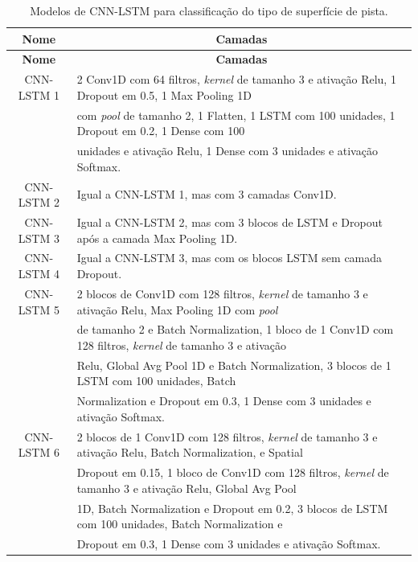 \begin{center}
\scriptsize
\begin{longtable}{cl}
\caption{Modelos de CNN-LSTM para classificação do tipo de superfície de pista.} 
\label{table:cnn_lstm_superficie_pista_1} \\
\toprule \textbf{Nome} & \multicolumn{1}{c}{\textbf{Camadas}} \\ \midrule
\endfirsthead
\toprule \textbf{Nome} & \multicolumn{1}{c}{\textbf{Camadas}} \\ \midrule
\endhead \endfoot \endlastfoot
CNN-LSTM 1 &  2 Conv1D com 64 filtros, \textit{kernel} de tamanho 3 e ativação Relu, 1 Dropout em 0.5, 1 Max Pooling 1D \\ & com \textit{pool} de tamanho 2, 1 Flatten, 1 LSTM com 100 unidades, 1 Dropout em 0.2, 1 Dense com 100 \\ & unidades e ativação Relu, 1 Dense com 3 unidades e ativação Softmax. \\ \midrule
CNN-LSTM 2 & Igual a CNN-LSTM 1, mas com 3 camadas Conv1D. \\ \midrule
CNN-LSTM 3 & Igual a CNN-LSTM 2, mas com 3 blocos de LSTM e Dropout após a camada Max Pooling 1D. \\ \midrule
CNN-LSTM 4 & Igual a CNN-LSTM 3, mas com os blocos LSTM sem camada Dropout. \\ \midrule
CNN-LSTM 5 &  2 blocos de Conv1D com 128 filtros, \textit{kernel} de tamanho 3 e ativação Relu, Max Pooling 1D com \textit{pool} \\ & de tamanho 2 e Batch Normalization, 1 bloco de 1 Conv1D com 128 filtros, \textit{kernel} de tamanho 3 e ativação \\ & Relu,  Global Avg Pool 1D e Batch Normalization, 3 blocos de 1 LSTM com 100 unidades, Batch \\ & Normalization e Dropout em 0.3, 1 Dense com 3 unidades e ativação Softmax. \\ \midrule
CNN-LSTM 6 & 2 blocos de 1 Conv1D com 128 filtros, \textit{kernel} de tamanho 3 e ativação Relu, Batch Normalization, e Spatial \\ &  Dropout em 0.15, 1 bloco de Conv1D com 128 filtros, \textit{kernel} de tamanho 3 e ativação Relu, Global Avg Pool \\& 1D, Batch Normalization e Dropout em 0.2, 3 blocos de LSTM com 100 unidades, Batch Normalization e \\ & Dropout em 0.3, 1 Dense com 3 unidades e ativação Softmax. \\ \bottomrule
\end{longtable}
\end{center}

